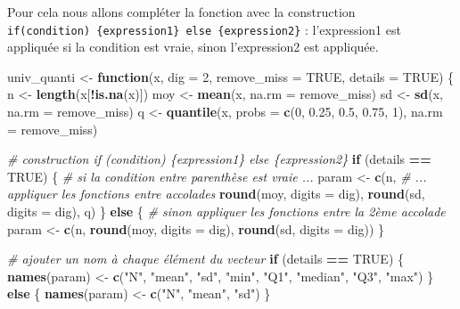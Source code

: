 \documentclass[
]{book}
\newenvironment{Shaded}{\begin{snugshade}}{\end{snugshade}}
\newcommand{\AttributeTok}[1]{\textcolor[rgb]{0.13,0.29,0.53}{#1}}
\newcommand{\CommentTok}[1]{\textcolor[rgb]{0.56,0.35,0.01}{\textit{#1}}}
\newcommand{\ConstantTok}[1]{\textcolor[rgb]{0.56,0.35,0.01}{#1}}
\newcommand{\ControlFlowTok}[1]{\textcolor[rgb]{0.13,0.29,0.53}{\textbf{#1}}}
\newcommand{\DecValTok}[1]{\textcolor[rgb]{0.00,0.00,0.81}{#1}}
\newcommand{\FloatTok}[1]{\textcolor[rgb]{0.00,0.00,0.81}{#1}}
\newcommand{\FunctionTok}[1]{\textcolor[rgb]{0.13,0.29,0.53}{\textbf{#1}}}
\newcommand{\NormalTok}[1]{#1}
\newcommand{\OtherTok}[1]{\textcolor[rgb]{0.56,0.35,0.01}{#1}}
\newcommand{\SpecialCharTok}[1]{\textcolor[rgb]{0.81,0.36,0.00}{\textbf{#1}}}
\newcommand{\StringTok}[1]{\textcolor[rgb]{0.31,0.60,0.02}{#1}}
\begin{document}
Pour cela nous allons compléter la fonction avec la construction \texttt{if(condition)\ \{expression1\}\ else\ \{expression2\}} : l'expression1 est appliquée si la condition est vraie, sinon l'expression2 est appliquée.

\begin{Shaded}
\begin{Highlighting}[]
\NormalTok{univ\_quanti }\OtherTok{\textless{}{-}} \ControlFlowTok{function}\NormalTok{(x, }\AttributeTok{dig =} \DecValTok{2}\NormalTok{, }\AttributeTok{remove\_miss =} \ConstantTok{TRUE}\NormalTok{, }\AttributeTok{details =} \ConstantTok{TRUE}\NormalTok{) \{ }
\NormalTok{  n }\OtherTok{\textless{}{-}} \FunctionTok{length}\NormalTok{(x[}\SpecialCharTok{!}\FunctionTok{is.na}\NormalTok{(x)])     }
\NormalTok{  moy }\OtherTok{\textless{}{-}} \FunctionTok{mean}\NormalTok{(x, }\AttributeTok{na.rm =}\NormalTok{ remove\_miss)}
\NormalTok{  sd }\OtherTok{\textless{}{-}} \FunctionTok{sd}\NormalTok{(x, }\AttributeTok{na.rm =}\NormalTok{ remove\_miss)}
\NormalTok{  q }\OtherTok{\textless{}{-}} \FunctionTok{quantile}\NormalTok{(x, }\AttributeTok{probs =} \FunctionTok{c}\NormalTok{(}\DecValTok{0}\NormalTok{, }\FloatTok{0.25}\NormalTok{, }\FloatTok{0.5}\NormalTok{, }\FloatTok{0.75}\NormalTok{, }\DecValTok{1}\NormalTok{), }\AttributeTok{na.rm =}\NormalTok{ remove\_miss)}
  
  \CommentTok{\# construction if (condition) \{expression1\} else \{expression2\}}
  \ControlFlowTok{if}\NormalTok{ (details }\SpecialCharTok{==} \ConstantTok{TRUE}\NormalTok{) \{ }\CommentTok{\# si la condition entre parenthèse est vraie ...}
\NormalTok{    param }\OtherTok{\textless{}{-}} \FunctionTok{c}\NormalTok{(n,        }\CommentTok{\# ... appliquer les fonctions entre accolades}
               \FunctionTok{round}\NormalTok{(moy, }\AttributeTok{digits =}\NormalTok{ dig), }
               \FunctionTok{round}\NormalTok{(sd, }\AttributeTok{digits =}\NormalTok{ dig), }
\NormalTok{               q)}
\NormalTok{  \} }\ControlFlowTok{else}\NormalTok{ \{ }\CommentTok{\# sinon appliquer les fonctions entre la 2ème accolade}
\NormalTok{    param }\OtherTok{\textless{}{-}} \FunctionTok{c}\NormalTok{(n, }
               \FunctionTok{round}\NormalTok{(moy, }\AttributeTok{digits =}\NormalTok{ dig), }
               \FunctionTok{round}\NormalTok{(sd, }\AttributeTok{digits =}\NormalTok{ dig))}
\NormalTok{  \}}
  
  \CommentTok{\# ajouter un nom à chaque élément du vecteur}
  \ControlFlowTok{if}\NormalTok{ (details }\SpecialCharTok{==} \ConstantTok{TRUE}\NormalTok{) \{}
    \FunctionTok{names}\NormalTok{(param) }\OtherTok{\textless{}{-}} \FunctionTok{c}\NormalTok{(}\StringTok{"N"}\NormalTok{, }\StringTok{"mean"}\NormalTok{, }\StringTok{"sd"}\NormalTok{, }\StringTok{"min"}\NormalTok{, }\StringTok{"Q1"}\NormalTok{, }\StringTok{"median"}\NormalTok{, }\StringTok{"Q3"}\NormalTok{, }\StringTok{"max"}\NormalTok{)}
\NormalTok{  \} }\ControlFlowTok{else}\NormalTok{ \{}
    \FunctionTok{names}\NormalTok{(param) }\OtherTok{\textless{}{-}} \FunctionTok{c}\NormalTok{(}\StringTok{"N"}\NormalTok{, }\StringTok{"mean"}\NormalTok{, }\StringTok{"sd"}\NormalTok{)}
\NormalTok{  \}}
  

\end{Highlighting}
\end{Shaded}
\end{document}
